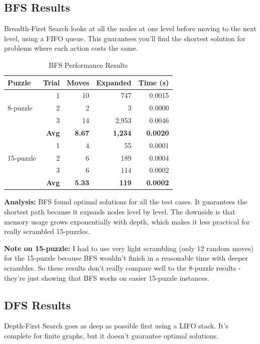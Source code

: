 \documentclass[letterpaper]{article}
\begin{document}
\subsection{BFS Results}

Breadth-First Search looks at all the nodes at one level before moving to the next level, using a FIFO queue. This guarantees you'll find the shortest solution for problems where each action costs the same.

\begin{table}[h]
\centering
\tiny
\begin{tabular}{lrrrr}
\toprule
\textbf{Puzzle} & \textbf{Trial} & \textbf{Moves} & \textbf{Expanded} & \textbf{Time (s)} \\
\midrule
\multirow{3}{*}{8-puzzle} & 1 & 10 & 747 & 0.0015 \\
& 2 & 2 & 3 & 0.0000 \\
& 3 & 14 & 2,953 & 0.0046 \\
\cmidrule{2-5}
& \textbf{Avg} & \textbf{8.67} & \textbf{1,234} & \textbf{0.0020} \\
\midrule
\multirow{3}{*}{15-puzzle} & 1 & 4 & 55 & 0.0001 \\
& 2 & 6 & 189 & 0.0004 \\
& 3 & 6 & 114 & 0.0002 \\
\cmidrule{2-5}
& \textbf{Avg} & \textbf{5.33} & \textbf{119} & \textbf{0.0002} \\
\bottomrule
\end{tabular}
\caption{BFS Performance Results}
\end{table}

\textbf{Analysis:} BFS found optimal solutions for all the test cases. It guarantees the shortest path because it expands nodes level by level. The downside is that memory usage grows exponentially with depth, which makes it less practical for really scrambled 15-puzzles. 

\textbf{Note on 15-puzzle:} I had to use very light scrambling (only 12 random moves) for the 15-puzzle because BFS wouldn't finish in a reasonable time with deeper scrambles. So these results don't really compare well to the 8-puzzle results - they're just showing that BFS works on easier 15-puzzle instances.

\subsection{DFS Results}

Depth-First Search goes as deep as possible first using a LIFO stack. It's complete for finite graphs, but it doesn't guarantee optimal solutions.
\end{document}
